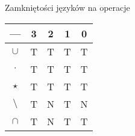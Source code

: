 \documentclass[main.tex]{subfiles}
\begin{document}
    Zamkniętości języków na operacje
    \begin{center}
        \begin{tabular}{||c c c c c||}
            \hline
            --- & 3 & 2 & 1 & 0 \\ [0.5ex]
            \hline\hline
            $\cup$ & T & T & T & T \\
            \hline
            $\cdot$ & T & T & T & T \\
            \hline
            $\star$ & T & T & T & T \\
            \hline
            $\setminus$ & T & N & T & N \\
            \hline
            $\cap $ & T & N & T & T \\ [1ex]
            \hline
        \end{tabular}
    \end{center}

    \newpage
\end{document}
